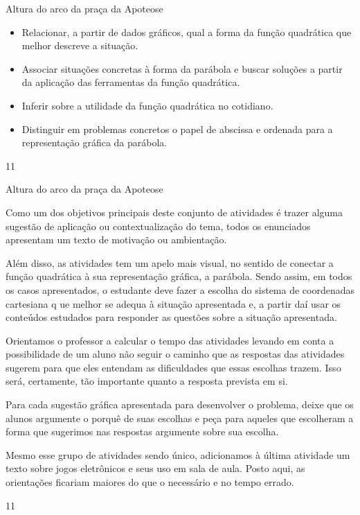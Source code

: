\cleardoublepage
\def\currentcolor{session1}
\begin{objectives}{Altura do arco da praça da Apoteose}
{
\begin{itemize}
\item Relacionar, a partir de dados gráficos, qual a forma da função quadrática que melhor descreve a situação.

\item {} 
Associar situações concretas à forma da parábola e buscar soluções a partir da aplicação das ferramentas da função quadrática.

\item {} 
Inferir sobre a utilidade da função quadrática no cotidiano.

\item {} 
Distinguir em problemas concretos o papel de abscissa e ordenada para a representação gráfica da parábola.
\end{itemize}
}{1}{1}
\end{objectives}
\begin{sugestions}{Altura do arco da praça da Apoteose}
{
Como um dos objetivos principais deste conjunto de atividades é trazer alguma sugestão de aplicação ou contextualização do tema, todos os enunciados apresentam um texto de motivação ou ambientação.

Além disso, as atividades tem um apelo mais visual, no sentido de conectar a função quadrática à sua representação gráfica, a parábola. Sendo assim, em todos os casos apresentados, o estudante deve fazer a escolha do sistema de coordenadas cartesiana q      ue melhor se adequa à situação apresentada e, a partir daí usar os conteúdos estudados para responder as questões sobre a situação apresentada.

Orientamos o professor a calcular o tempo das atividades levando em conta a possibilidade de um aluno não seguir o caminho que as respostas das atividades sugerem para que eles entendam as dificuldades que essas escolhas trazem. Isso será, certamente, tão importante quanto a resposta prevista em si.

Para cada sugestão gráfica apresentada para desenvolver o problema, deixe que os alunos argumente o porquê de suas escolhas e peça para aqueles que escolheram a forma que sugerimos nas respostas argumente sobre sua escolha.

Mesmo esse grupo de atividades sendo único, adicionamos à última atividade um texto sobre jogos eletrônicos e seus uso em sala de aula. Posto aqui, as orientações ficariam maiores do que o necessário e no tempo errado.
}{1}{1}
\end{sugestions}
